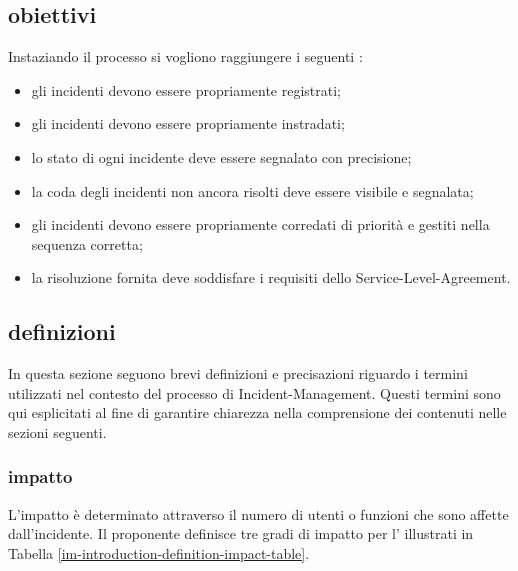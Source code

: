 \subsection[Obiettivi]{obiettivi}
\label{im-introduction-objectives}
Instaziando il processo si vogliono raggiungere i seguenti :

\begin{itemize}
\item{gli incidenti devono essere propriamente registrati;}
\item{gli incidenti devono essere propriamente instradati;}
\item{lo stato di ogni incidente deve essere segnalato con precisione;}
\item{la coda degli incidenti non ancora risolti deve essere visibile e segnalata;}
\item{gli incidenti devono essere propriamente corredati di priorità e gestiti nella sequenza corretta;}
\item{la risoluzione fornita deve soddisfare i requisiti dello \ac{Service-Level-Agreement}.}
\end{itemize}

\subsection[Definizioni]{definizioni}
\label{im-introduction-definitions}
In questa sezione seguono brevi definizioni e precisazioni riguardo i termini utilizzati nel contesto del processo di \ac{Incident-Management}. Questi termini sono qui esplicitati al fine di garantire chiarezza nella comprensione dei contenuti nelle sezioni seguenti.

\subsubsection{impatto}
L'impatto è determinato attraverso il numero di utenti o funzioni che sono affette dall'incidente. Il proponente definisce tre gradi di impatto per l'\entity{} illustrati in Tabella \ref{im-introduction-definition-impact-table}.

